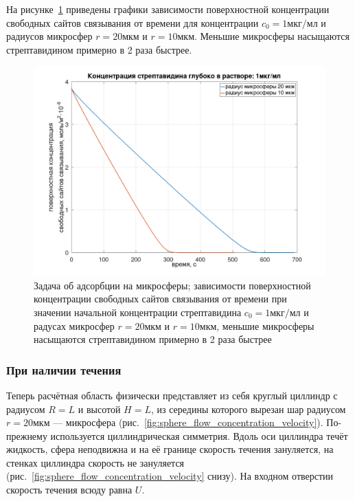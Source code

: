 \documentclass[oneside,final,12pt]{extreport}
\begin{document}
На рисунке~\ref{fig:sphere_stationary_big_small}
приведены графики зависимости поверхностной концентрации
свободных сайтов связывания от времени для концентрации
$c_0 = 1\text{мкг}/\text{мл}$ и радиусов микросфер
$r = 20\text{мкм}$ и $r = 10\text{мкм}$.
Меньшие микросферы насыщаются стрептавидином примерно в 2 раза быстрее.

\begin{figure}
  \centering
  \includegraphics[width=.7\textwidth]{pic/sphere_stationary_big_small}

  \caption{%
    \label{fig:sphere_stationary_big_small}%
    Задача об адсорбции на микросферы;
    зависимости поверхностной концентрации свободных сайтов связывания
    от времени при значении начальной концентрации стрептавидина
    $c_0 = 1\text{мкг}/\text{мл}$ и радусах микросфер
    $r = 20\text{мкм}$ и $r = 10\text{мкм}$,
    меньшие микросферы насыщаются стрептавидином примерно в 2 раза быстрее
  }

\end{figure}



\FloatBarrier{}
\subsubsection*{При наличии течения}

Теперь расчётная область физически представляет из себя круглый циллиндр
с радиусом $R = L$ и высотой $H = L$,
из середины которого вырезан шар радиусом $r = 20\text{мкм}$ --- микросфера
(рис.~\ref{fig:sphere_flow_concentration_velocity}).
По-прежнему используется циллиндрическая симметрия.
Вдоль оси циллиндра течёт жидкость,
сфера неподвижна и на её границе скорость течения зануляется,
на стенках циллиндра скорость не зануляется
(рис.~\ref{fig:sphere_flow_concentration_velocity} снизу).
На входном отверстии скорость течения всюду равна $U$.
\end{document}
